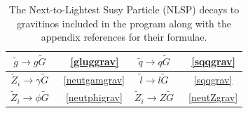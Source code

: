\documentclass[final,3p,times]{elsarticle}
\begin{document}
\begin{center}
\begin{table}
\centering
\begin{tabular}{|c|c|c|c|} \hline
$\tilde{g} \rightarrow g \tilde{G}$ &~\ref{gluggrav} & $\tilde{q} \rightarrow q \tilde{G}$ &~\ref{sqqgrav} \\ \hline
$\tilde{Z}_i \rightarrow \gamma \tilde{G}$ &~\ref{neutgamgrav} & $\tilde{l} \rightarrow l \tilde{G}$ &~\ref{sqqgrav} \\ \hline
$\tilde{Z}_i \rightarrow \phi \tilde{G}$ &~\ref{neutphigrav} & $\tilde{Z}_i \rightarrow Z \tilde{G}$ &~\ref{neutZgrav} \\ \hline 
\end{tabular}
\caption{The Next-to-Lightest Susy Particle (NLSP) decays to gravitinos included in the program along with the appendix references for their formulae.}
\label{Gravitinodecaysreftable}
\end{table}
\end{center}
\end{document}
